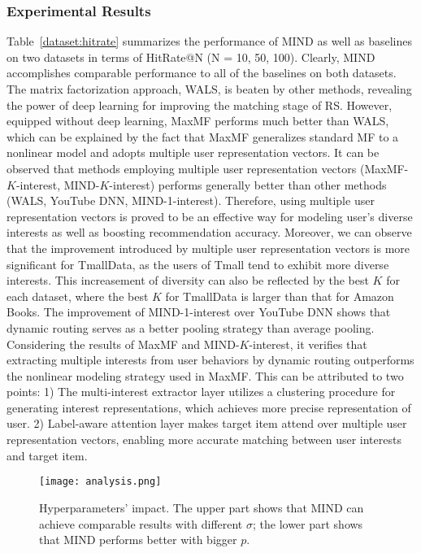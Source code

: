 \documentclass[sigconf]{acmart}
\begin{document}
\subsubsection{Experimental Results}

Table~\ref{dataset:hitrate} summarizes the performance of MIND as well as baselines on two datasets in terms of HitRate@N (N = 10, 50, 100).
Clearly, MIND accomplishes comparable performance to all of the baselines on both datasets.
The matrix factorization approach, WALS, is beaten by other methods, revealing the power of deep learning for improving the matching stage of RS.
However, equipped without deep learning, MaxMF performs much better than WALS, which can be explained by the fact that MaxMF generalizes standard MF to a nonlinear model and adopts multiple user representation vectors.
It can be observed that methods employing multiple user representation vectors (MaxMF-$K$-interest, MIND-$K$-interest) performs generally better than other methods (WALS, YouTube DNN, MIND-1-interest).
Therefore, using multiple user representation vectors is proved to be an effective way for modeling user's diverse interests as well as boosting recommendation accuracy.
Moreover, we can observe that the improvement introduced by multiple user representation vectors is more significant for TmallData, as the users of Tmall tend to exhibit more diverse interests.
This increasement of diversity can also be reflected by the best $K$ for each dataset, where
the best $K$ for TmallData is larger than that for Amazon Books.
The improvement of MIND-1-interest over YouTube DNN shows that dynamic routing serves as a better pooling strategy than average pooling.
Considering the results of MaxMF and MIND-$K$-interest, it verifies that extracting multiple interests from user behaviors by dynamic routing outperforms the nonlinear modeling strategy used in MaxMF.
This can be attributed to two points:
1) The multi-interest extractor layer utilizes a clustering procedure for generating interest representations, which achieves more precise representation of user.
2) Label-aware attention layer makes target item attend over multiple user representation vectors, enabling more accurate matching between user interests and target item.

\begin{figure}[h]
  \centering
  \texttt{[image: analysis.png]}
  \caption{Hyperparameters' impact. The upper part shows that MIND can achieve comparable results with different $\sigma$; the lower part shows that MIND performs better with bigger $p$.}
  \label{fig:analysis}
\end{figure}
\end{document}
